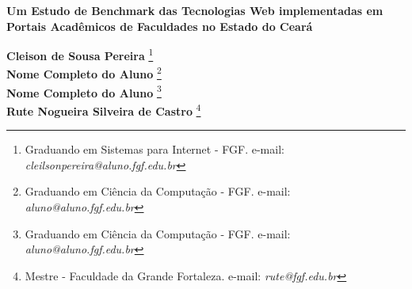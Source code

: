 \documentclass[12pt]{article}
\begin{document}

%



\begin{center}
\textbf{\Large{Um Estudo de Benchmark das Tecnologias Web implementadas em Portais Acadêmicos de Faculdades no Estado do Ceará}}\\
\end{center}

\vspace*{0.2cm}

\begin{flushright}
 {\bf Cleison de Sousa Pereira} \footnote[1]{Graduando em Sistemas para Internet - FGF. e-mail: \it cleilsonpereira@aluno.fgf.edu.br}  \\
 {\bf Nome Completo do Aluno} \footnote[2]{Graduando em Ciência da Computação - FGF. e-mail: \it aluno@aluno.fgf.edu.br}  \\
  {\bf Nome Completo do Aluno} \footnote[3]{Graduando em Ciência da Computação - FGF. e-mail: \it aluno@aluno.fgf.edu.br}  \\
   {\bf Rute Nogueira Silveira de Castro} \footnote[4]{Mestre - Faculdade da Grande Fortaleza. e-mail: \it rute@fgf.edu.br}   \\
\end{flushright}

\vspace*{0.5cm}

\end{document}
